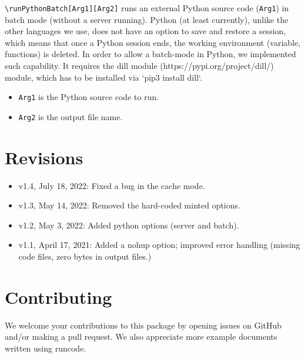 \documentclass{ltxdoc}
\begin{document}
\noindent \verb|\runPythonBatch[Arg1][Arg2]| runs an external Python source code (\texttt{Arg1}) in batch mode (without a server running). Python (at least currently), unlike the other languages we use, does not have an option to save and restore a session, which means that once a Python session ends, the working environment (variable, functions) is deleted. In order to allow a batch-mode in Python, we implemented such capability. It requires the dill module (https://pypi.org/project/dill/) module, which has to be installed via  `pip3 install dill`.
\begin{itemize}
\item \texttt{Arg1} is the Python source code to run.
\item \texttt{Arg2} is the output file name.
\end{itemize}

 


\section{Revisions}
\begin{itemize}
\item v1.4, July 18, 2022: Fixed a bug in the cache mode.
\item v1.3, May 14, 2022: Removed the hard-coded minted options.
\item v1.2, May 3, 2022: Added python options (server and batch).
\item v1.1, April 17, 2021: Added a nohup option; improved error handling (missing code files, zero bytes in output files.)
\end{itemize}

%
\section{Contributing}
We welcome your contributions to this package by opening issues on GitHub and/or making a pull request. We also appreciate more example documents written using \textsf{runcode}.
\end{document}

